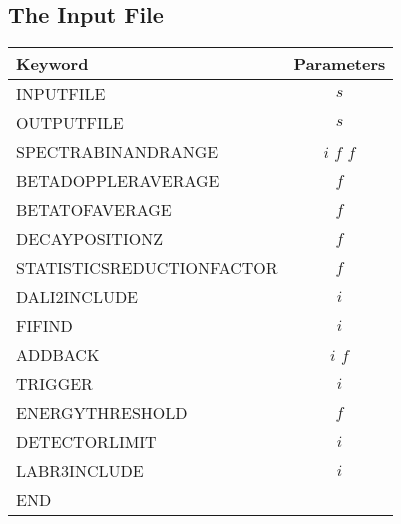 \documentclass[12pt]{book}
\begin{document}
\FloatBarrier
\subsection{The Input File}\label{chap:RecDLBin}


\begin{table}[ht]
  \centering
  \label{tab:RECONSTRUCTORDLBKEY}
  \begin{tabular}{|l||c|}
    \hline
    Keyword & Parameters \\
    \hline
    \hline
    INPUTFILE                        & $s$             \\
    OUTPUTFILE                       & $s$             \\
    SPECTRABINANDRANGE               & $i$ $f$ $f$     \\
    BETADOPPLERAVERAGE               & $f$             \\
    BETATOFAVERAGE                   & $f$             \\
    DECAYPOSITIONZ                   & $f$             \\
    STATISTICSREDUCTIONFACTOR        & $f$             \\
    
    DALI2INCLUDE                     & $i$             \\
    FIFIND                           & $i$             \\
    
    ADDBACK			& $i$ $f$ \\
    TRIGGER			& $i$ \\
    ENERGYTHRESHOLD		& $f$ \\
    DETECTORLIMIT		& $i$ \\
    
    LABR3INCLUDE                     & $i$             \\
    END                              &                 \\
    \hline
  \end{tabular}
\end{table}
\end{document}
